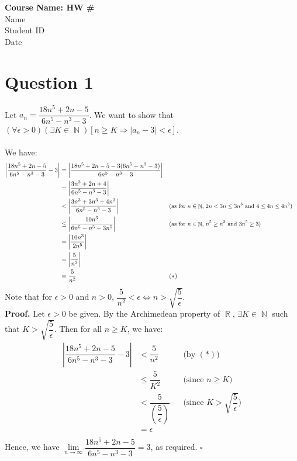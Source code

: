 \documentclass[a4paper,11pt]{article}
\renewenvironment{proof}{{\bfseries Proof.}}{\hfill $\square$}
\DeclareMathOperator{\R}{\mathbb{R}}
\DeclareMathOperator{\N}{\mathbb{N}}
\begin{document}
\begin{titlepage}
    \begin{center}
    \huge{\bfseries Course Name: HW \#}\\
         \vspace{0.5cm}
    \large{Name}\\
    \large{Student ID}\\
     \large{Date}\\
    \end{center}
    \begin{center}
    	\tableofcontents
    \end{center}
\end{titlepage}

\pagestyle{fancy}
\fancyhf{}

\section{Question 1}
Let $a_n = \dfrac{18n^5+2n-5}{6n^5-n^3-3}$. We want to show that $(\forall \epsilon > 0)(\exists K \in \N)[n \geq K \Rightarrow |a_n-3| < \epsilon]$. \\\\
We have:
\begin{align*}
\left|\dfrac{18n^5+2n-5}{6n^5-n^3-3} - 3\right| &= \left|\dfrac{18n^5+2n-5 - 3(6n^5-n^3-3)}{6n^5-n^3-3}\right| \\
&= \left|\dfrac{3n^3+2n+4}{6n^5-n^3-3}\right| \\
&< \left|\dfrac{3n^3+3n^3+4n^3}{6n^5-n^3-3}\right| && \text{\small(as for $n \in \N$, $2n < 3n \leq 3n^3$ and $4 \leq 4n \leq 4n^3$)} \\
&\leq \left|\dfrac{10n^3}{6n^5-n^5-3n^5}\right| && \text{\small(as for $n \in \N$, $n^5 \geq n^3$ and $3n^5 \geq 3$)} \\
&=\left|\dfrac{10n^3}{2n^5}\right| \\
&=\left|\dfrac{5}{n^2}\right| \\
&=\dfrac{5}{n^2} && \text{$(*)$}
\end{align*}
Note that for $\epsilon > 0$ and $n > 0$, $\dfrac{5}{n^2} < \epsilon \iff n > \sqrt{\dfrac{5}{\epsilon}}$. \\
\begin{proof}
Let $\epsilon > 0$ be given. By the Archimedean property of $\R$, $\exists K \in \N$ such that $K >  \sqrt{\dfrac{5}{\epsilon}}$. Then for all $n \geq K$, we have:
\begin{align*}
\left|\dfrac{18n^5+2n-5}{6n^5-n^3-3} - 3\right| &< \dfrac{5}{n^2} && \text{(by $(*))$} \\
&\leq \dfrac{5}{K^2} && \text{(since $n \geq K$)} \\
&< \dfrac{5}{\left(\dfrac{5}{\epsilon}\right)} && \text{(since $K > \sqrt{\dfrac{5}{\epsilon}}$)} \\
&= \epsilon \\
\end{align*} 
Hence, we have $\lim\limits_{n \to \infty}{\dfrac{18n^5+2n-5}{6n^5-n^3-3}} = 3$, as required.
\end{proof}
\end{document}
